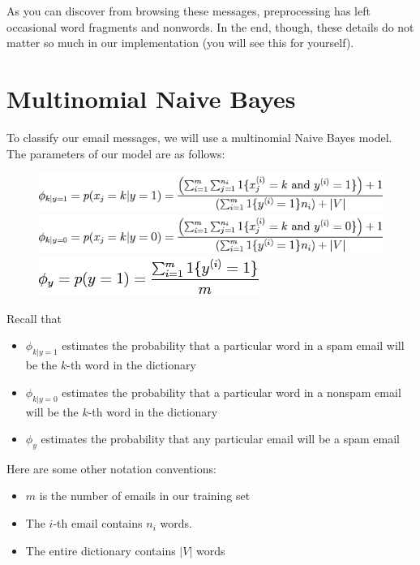 \documentclass[10pt,a4paper]{article}
\begin{document}
  As you can discover from browsing these messages, preprocessing has left occasional word fragments and nonwords. In the end, though, these details do not matter so much in our implementation (you will see this for yourself).




\section{Multinomial Naive Bayes}
%
  To classify our email messages, we will use a multinomial Naive Bayes model. The parameters of our model are as follows:
  \begin{figure}[htb!]
    \centering
      \includegraphics[width=.8\columnwidth]{img1} \\
      \includegraphics[width=.8\columnwidth]{img2} \\
      \includegraphics[width=.4\columnwidth]{img3}
  \end{figure}
  Recall that
  \begin{itemize}
    \item $\phi_{k\vert y=1}$ estimates the probability that a particular word in a spam email will be the $k$-th word in the dictionary
    \item $\phi_{k\vert y=0}$ estimates the probability that a particular word in a nonspam email will be the $k$-th word in the dictionary
    \item $\phi_{y}$ estimates the probability that any particular email will be a spam email
  \end{itemize}
  Here are some other notation conventions:
  \begin{itemize}
    \item $m$ is the number of emails in our training set
    \item The $i$-th email contains $n_{i}$ words.
    \item The entire dictionary contains $\vert V\vert$ words
  \end{itemize}
\end{document}
